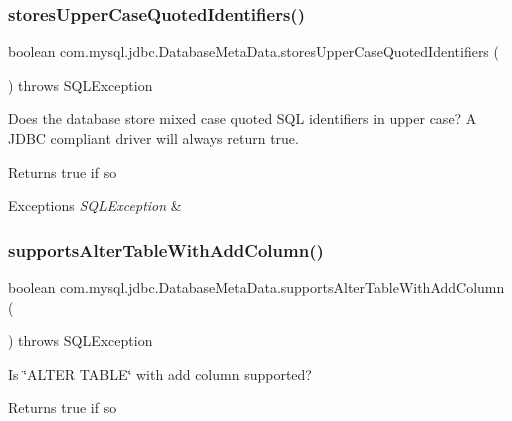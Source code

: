 \subsubsection{\texorpdfstring{stores\+Upper\+Case\+Quoted\+Identifiers()}{storesUpperCaseQuotedIdentifiers()}}
{\footnotesize\ttfamily boolean com.\+mysql.\+jdbc.\+Database\+Meta\+Data.\+stores\+Upper\+Case\+Quoted\+Identifiers (\begin{DoxyParamCaption}{ }\end{DoxyParamCaption}) throws S\+Q\+L\+Exception}

Does the database store mixed case quoted S\+QL identifiers in upper case? A J\+D\+BC compliant driver will always return true.

\begin{DoxyReturn}{Returns}
true if so 
\end{DoxyReturn}

\begin{DoxyExceptions}{Exceptions}
{\em S\+Q\+L\+Exception} & \\
\hline
\end{DoxyExceptions}
\mbox{\label{classcom_1_1mysql_1_1jdbc_1_1_database_meta_data_a07eb0ac9ab8a56f89de3feb8b156caa0}} 
\subsubsection{\texorpdfstring{supports\+Alter\+Table\+With\+Add\+Column()}{supportsAlterTableWithAddColumn()}}
{\footnotesize\ttfamily boolean com.\+mysql.\+jdbc.\+Database\+Meta\+Data.\+supports\+Alter\+Table\+With\+Add\+Column (\begin{DoxyParamCaption}{ }\end{DoxyParamCaption}) throws S\+Q\+L\+Exception}

Is \char`\"{}\+A\+L\+T\+E\+R T\+A\+B\+L\+E\char`\"{} with add column supported?

\begin{DoxyReturn}{Returns}
true if so 
\end{DoxyReturn}

